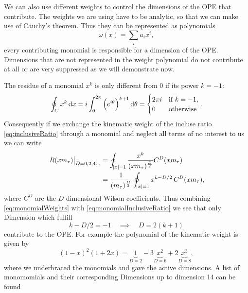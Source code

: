 \documentclass[../../index.tex]{subfiles}
\begin{document}
We can also use different weights to control the dimensions of the OPE that
contribute. The weights we are using have to be analytic, so that we can make
use of Cauchy's theorem. Thus they can be represented as polynomials
\begin{equation}
  \omega(x) = \sum_i a_i x^i,
\end{equation}
every contributing monomial is responsible for a dimension of the OPE.
Dimensions that are not represented in the weight polynomial do not contribute
at all or are very suppressed as we will demonstrate now.

The residue of a monomial $x^k$ is only different from 0 if its power $k=-1$:
\begin{equation}
  \label{eq:monomialWeights}
  \oint_{C} x^k \dif x = i \int_0^{2\pi}\left(e^{i \theta}\right)^{k+1} \dif \theta
  = \begin{cases} \mbox{$2 \pi i$} & \mbox{if } k=-1, \\ \mbox{0} & \mbox{otherwise} \end{cases}.
\end{equation}
Consequently if we exchange the kinematic weight of the incluse ratio
\cref{eq:inclusiveRatio} through a monomial and neglect all terms of no interest
to us we can write
\begin{equation}
  \label{eq:monomialInclusiveRatio}
  \begin{split}
  \left. R(x m_\tau) \right\rvert_{D=0,2,4\dots} &= \oint_{\abs{x}=1} \frac{x^k}{(x m_\tau)^{\frac{D}{2}}}C^{D}(x m_\tau) \\
  &= \frac{1}{(m_\tau)^{\frac{D}{2}}} \oint_{\abs{x}=1} x^{k-D/2} \,C^{D}(x m_\tau),
  \end{split}
\end{equation}
where $C^{D}$ are the $D$-dimensional Wilson coefficients. Thus combining
\cref{eq:monomialWeights} with \cref{eq:monomialInclusiveRatio} we see that
only Dimension  which fulfill
\begin{equation}
  k - D/2 = -1 \quad \implies \quad  D = 2(k+1)
\end{equation}
contribute to the OPE. For example the polynomial of the kinematic weight is
given by
\begin{equation}
  (1 - x)^2 (1 + 2x) = \underbrace{1}_{D=2} - 3\underbrace{x^2}_{D=6} + 2\underbrace{x^3}_{D=8},
\end{equation}
where we underbraced the monomials and gave the active dimensions. A list of
monomomials and their corresponding Dimensions up to dimension 14 can be found
\end{document}

